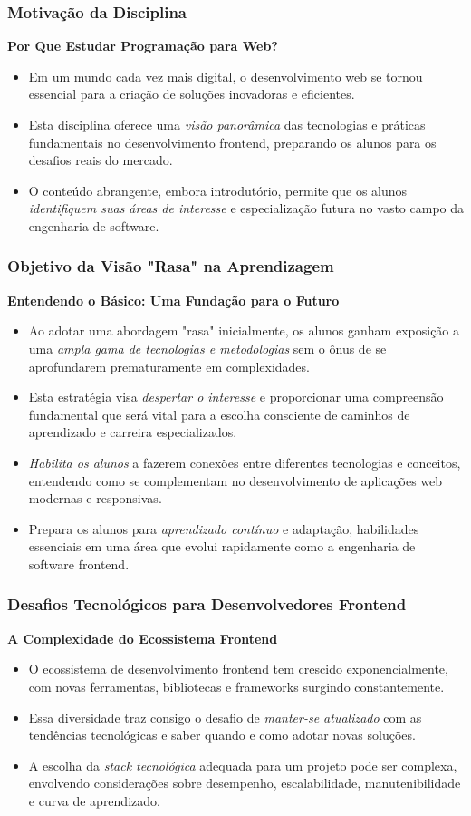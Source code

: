 \begin{frame}[fragile]
  \frametitle{Motivação da Disciplina}
  \textbf{Por Que Estudar Programação para Web?}
  \begin{itemize}
    \item Em um mundo cada vez mais digital, o desenvolvimento web se tornou essencial para a criação de soluções inovadoras e eficientes.
    \item Esta disciplina oferece uma \textit{visão panorâmica} das tecnologias e práticas fundamentais no desenvolvimento frontend, preparando os alunos para os desafios reais do mercado.
    \item O conteúdo abrangente, embora introdutório, permite que os alunos \textit{identifiquem suas áreas de interesse} e especialização futura no vasto campo da engenharia de software.
  \end{itemize}
\end{frame}

\begin{frame}[fragile]
  \frametitle{Objetivo da Visão "Rasa" na Aprendizagem}
  \textbf{Entendendo o Básico: Uma Fundação para o Futuro}
  \begin{itemize}
    \item Ao adotar uma abordagem "rasa" inicialmente, os alunos ganham exposição a uma \textit{ampla gama de tecnologias e metodologias} sem o ônus de se aprofundarem prematuramente em complexidades.
    \item Esta estratégia visa \textit{despertar o interesse} e proporcionar uma compreensão fundamental que será vital para a escolha consciente de caminhos de aprendizado e carreira especializados.
    \item \textit{Habilita os alunos} a fazerem conexões entre diferentes tecnologias e conceitos, entendendo como se complementam no desenvolvimento de aplicações web modernas e responsivas.
    \item Prepara os alunos para \textit{aprendizado contínuo} e adaptação, habilidades essenciais em uma área que evolui rapidamente como a engenharia de software frontend.
  \end{itemize}
\end{frame}

\begin{frame}[fragile]
  \frametitle{Desafios Tecnológicos para Desenvolvedores Frontend}
  \textbf{A Complexidade do Ecossistema Frontend}
  \begin{itemize}
    \item O ecossistema de desenvolvimento frontend tem crescido exponencialmente, com novas ferramentas, bibliotecas e frameworks surgindo constantemente.
    \item Essa diversidade traz consigo o desafio de \textit{manter-se atualizado} com as tendências tecnológicas e saber quando e como adotar novas soluções.
    \item A escolha da \textit{stack tecnológica} adequada para um projeto pode ser complexa, envolvendo considerações sobre desempenho, escalabilidade, manutenibilidade e curva de aprendizado.
  \end{itemize}
\end{frame}

